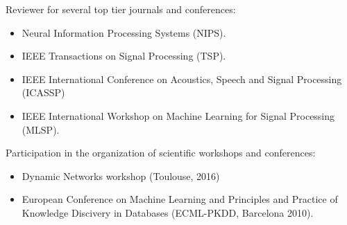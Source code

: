\documentclass[paper=a4,fontsize=11pt]{temp} %
\begin{document}
Reviewer for several top tier journals and conferences:
\begin{itemize}
\item Neural Information Processing Systems (NIPS).
\item IEEE Transactions on Signal Processing (TSP).
\item IEEE International Conference on Acoustics, Speech and Signal Processing (ICASSP)
\item  IEEE International Workshop on Machine Learning for Signal Processing (MLSP).
\end{itemize}
Participation in the organization of scientific workshops and conferences:
\begin{itemize}
\item Dynamic Networks workshop (Toulouse, 2016)
\item European Conference on Machine Learning and Principles and Practice of Knowledge Discivery in Databases (ECML-PKDD, Barcelona 2010).
\end{itemize}
\end{document}
